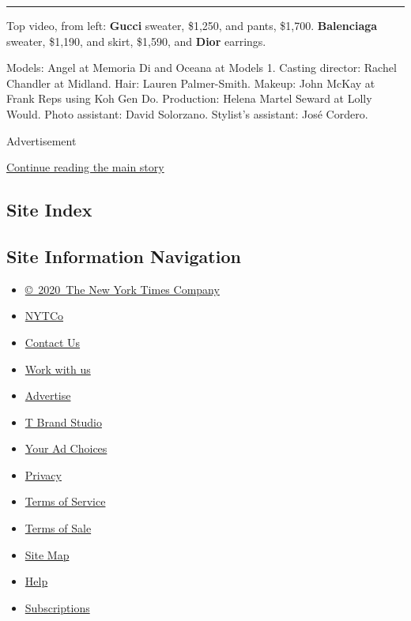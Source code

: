 \begin{center}\rule{0.5\linewidth}{\linethickness}\end{center}

Top video, from left: \textbf{Gucci} sweater, \$1,250, and pants,
\$1,700. \textbf{Balenciaga} sweater, \$1,190, and skirt, \$1,590, and
\textbf{Dior} earrings.

Models: Angel at Memoria Di and Oceana at Models 1. Casting director:
Rachel Chandler at Midland. Hair: Lauren Palmer-Smith. Makeup: John
McKay at Frank Reps using Koh Gen Do. Production: Helena Martel Seward
at Lolly Would. Photo assistant: David Solorzano. Stylist's assistant:
José Cordero.

Advertisement

\protect\hyperlink{after-bottom}{Continue reading the main story}

\hypertarget{site-index}{%
\subsection{Site Index}\label{site-index}}

\hypertarget{site-information-navigation}{%
\subsection{Site Information
Navigation}\label{site-information-navigation}}

\begin{itemize}
\tightlist
\item
  \href{https://help.nytimes3xbfgragh.onion/hc/en-us/articles/115014792127-Copyright-notice}{©~2020~The
  New York Times Company}
\end{itemize}

\begin{itemize}
\tightlist
\item
  \href{https://www.nytco.com/}{NYTCo}
\item
  \href{https://help.nytimes3xbfgragh.onion/hc/en-us/articles/115015385887-Contact-Us}{Contact
  Us}
\item
  \href{https://www.nytco.com/careers/}{Work with us}
\item
  \href{https://nytmediakit.com/}{Advertise}
\item
  \href{http://www.tbrandstudio.com/}{T Brand Studio}
\item
  \href{https://www.nytimes3xbfgragh.onion/privacy/cookie-policy\#how-do-i-manage-trackers}{Your
  Ad Choices}
\item
  \href{https://www.nytimes3xbfgragh.onion/privacy}{Privacy}
\item
  \href{https://help.nytimes3xbfgragh.onion/hc/en-us/articles/115014893428-Terms-of-service}{Terms
  of Service}
\item
  \href{https://help.nytimes3xbfgragh.onion/hc/en-us/articles/115014893968-Terms-of-sale}{Terms
  of Sale}
\item
  \href{https://spiderbites.nytimes3xbfgragh.onion}{Site Map}
\item
  \href{https://help.nytimes3xbfgragh.onion/hc/en-us}{Help}
\item
  \href{https://www.nytimes3xbfgragh.onion/subscription?campaignId=37WXW}{Subscriptions}
\end{itemize}
